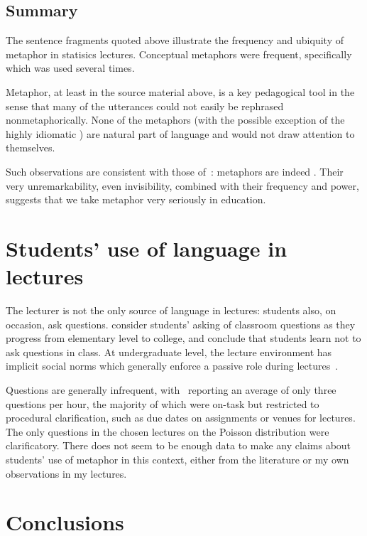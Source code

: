 \subsection{Summary}

The sentence fragments quoted above illustrate the frequency and
ubiquity of metaphor in statisics lectures.  Conceptual metaphors were
frequent, specifically  which was used
several times.

Metaphor, at least in the source material above, is a key pedagogical
tool in the sense that many of the utterances could not easily be
rephrased nonmetaphorically.  None of the metaphors (with the possible
exception of the highly idiomatic ) are
natural part of language and would not draw attention to themselves.

Such observations are consistent with those of~:
metaphors are indeed .  Their very
unremarkability, even invisibility, combined with their frequency and
power, suggests that we take metaphor very seriously in education.

\section{Students' use of language in lectures}

The lecturer is not the only source of language in lectures: students
also, on occasion, ask questions.   consider
students' asking of classroom questions as they progress from
elementary level to college, and conclude that students learn not to
ask questions in class.  At undergraduate level, the lecture
environment has implicit social norms which generally enforce a
passive role during lectures~\citep{yoon2011}.

Questions are generally infrequent, with~
reporting an average of only three questions per hour, the majority of
which were on-task but restricted to procedural clarification, such as
due dates on assignments or venues for lectures.  The only questions
in the chosen lectures on the Poisson distribution were clarificatory.
There does not seem to be enough data to make any claims about
students' use of metaphor in this context, either from the literature
or my own observations in my lectures.

\section{Conclusions}


